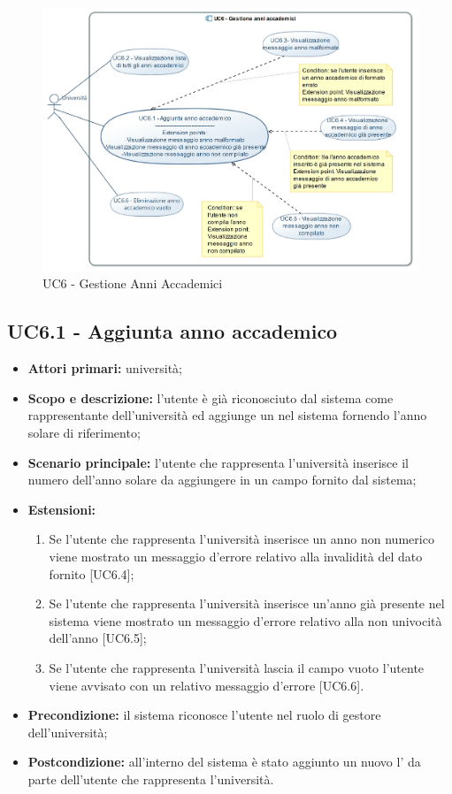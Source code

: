 \documentclass[AnalisiDeiRequisiti.tex]{subfiles}
\begin{document}
\begin{figure}[H]
	\centering
	\includegraphics[width=1.1\linewidth]{UC6.jpg}
	\caption{UC6 - Gestione Anni Accademici}
	\label{fig:UC6 - Gestione Anni Accademici}
\end{figure}

\subsection{UC6.1 - Aggiunta anno accademico}
\begin{itemize}
	\item \textbf{Attori primari:} università;
	\item \textbf{Scopo e descrizione:} l'utente è già riconosciuto dal sistema come rappresentante dell'università ed aggiunge un  nel sistema fornendo l'anno solare di riferimento;
	\item \textbf{Scenario principale:} l'utente che rappresenta l'università inserisce il numero dell'anno solare da aggiungere in un campo fornito dal sistema;
	\item \textbf{Estensioni:}
	\begin{enumerate}
		\item Se l'utente che rappresenta l'università inserisce un anno non numerico viene mostrato un messaggio d'errore relativo alla invalidità del dato fornito [UC6.4];
		\item Se l'utente che rappresenta l'università inserisce un'anno già presente nel sistema viene mostrato un messaggio d'errore relativo alla non univocità dell'anno [UC6.5];
		\item Se l'utente che rappresenta l'università lascia il campo vuoto l'utente viene avvisato con un relativo messaggio d'errore [UC6.6].
	\end{enumerate}
	\item \textbf{Precondizione:} il sistema riconosce l'utente nel ruolo di gestore dell'università; 
	\item \textbf{Postcondizione:} all'interno del sistema è stato aggiunto un nuovo l' da parte dell'utente che rappresenta l'università.
\end{itemize}
\end{document}
